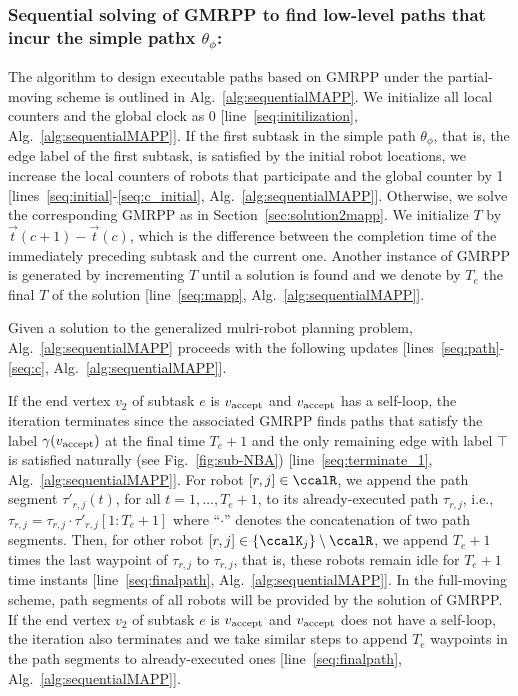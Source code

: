 \documentclass[Afour,sageh,times]{sagej}
\newcommand{\vertex}[1]{v_{\textup{#1}}}
\begin{document}
 \subsubsection{Sequential solving of  GMRPP to find low-level paths that incur the simple pathx $\theta_\phi$:}
The algorithm to design executable paths based on GMRPP under the  partial-moving scheme is outlined in Alg.~\ref{alg:sequentialMAPP}.  We initialize all local counters and the global clock as 0 [line~\ref{seq:initilization}, Alg.~\ref{alg:sequentialMAPP}].
If the first subtask in the simple path $\theta_\phi$, that is, the edge label of the first subtask,  is satisfied by the initial  robot locations, we increase the local counters of robots that participate  and the global counter by 1 [lines~\ref{seq:initial}-\ref{seq:c_initial}, Alg.~\ref{alg:sequentialMAPP}]. Otherwise, we solve the corresponding GMRPP as in Section~\ref{sec:solution2mapp}.  We initialize $T$ by $\vec{t}(c+1) - \vec{t}(c)$,  which is the difference between the completion time of the immediately preceding subtask and the current one. Another instance of GMRPP is generated by incrementing $T$ until a solution is found and we denote by $T_e$  the final $T$ of the solution [line~\ref{seq:mapp}, Alg.~\ref{alg:sequentialMAPP}]. {Given a solution to the generalized mulri-robot planning problem, Alg.~\ref{alg:sequentialMAPP} proceeds with the following updates [lines~\ref{seq:path}-\ref{seq:c}, Alg.~\ref{alg:sequentialMAPP}].

{If the  end vertex $v_2$ of subtask $e$ is $\vertex{accept}$ and $\vertex{accept}$ has a self-loop, the iteration terminates since the associated GMRPP finds paths that satisfy the label $\gamma(\vertex{accept})$ at the final time $T_e + 1$ and the only remaining edge with label $\top$ is satisfied naturally (see Fig.~\ref{fig:sub-NBA}) [line~\ref{seq:terminate_1}, Alg.~\ref{alg:sequentialMAPP}]. For robot $[r, j] \in \ccalR$, we append the path segment $\tau'_{r,j}(t)$, for all $t = 1, \ldots, T_e+1$, to its already-executed path $\tau_{r,j}$, i.e.,  $\tau_{r,j} = \tau_{r,j} \cdot \tau'_{r,j}[1:T_e+1]$ where ``$\cdot$'' denotes the concatenation of two path segments. Then, for other robot $[r,j] \in \{\ccalK_j\}\setminus \ccalR$, we  append  $T_e+1$ times  the last waypoint of  $\tau_{r,j}$  to $\tau_{r,j}$, that is, these robots  remain idle for $T_e+1$ time instants [line~\ref{seq:finalpath}, Alg.~\ref{alg:sequentialMAPP}]. In the full-moving scheme, path segments of all robots will be provided by the solution of GMRPP. If the  end vertex $v_2$ of subtask $e$ is $\vertex{accept}$ and $\vertex{accept}$ does not have a self-loop, the iteration also terminates and  we take similar steps to append $T_e$ waypoints in the path segments to already-executed ones [line~\ref{seq:finalpath}, Alg.~\ref{alg:sequentialMAPP}].

}}
\end{document}
